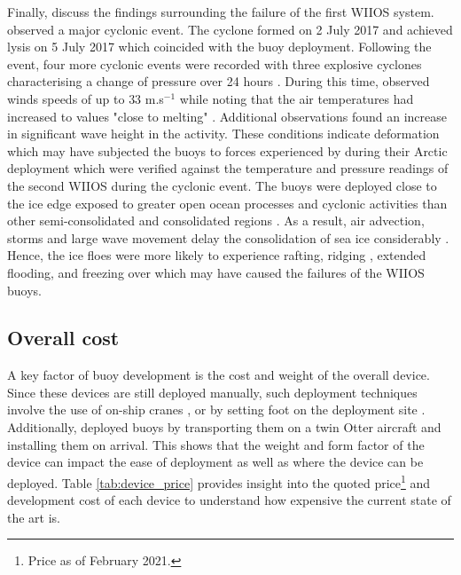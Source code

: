 Finally, \textcite{vichi2019effects} discuss the findings surrounding the failure of the first WIIOS system. \textcite{vichi2019effects} observed a major cyclonic event. The cyclone formed on  2 July 2017 and achieved lysis on 5 July 2017 which coincided with the buoy deployment. Following the event, four more cyclonic events were recorded with three explosive cyclones characterising a change of pressure over 24 hours \cite{vichi2019effects}. During this time, \textcite{vichi2019effects} observed winds speeds of up to $33$ m.s$^{-1}$ while noting that the air temperatures had increased to values "close to melting" \cite{vichi2019effects}. Additional observations found an increase in significant wave height in the activity. These conditions indicate deformation \cite{vichi2019effects} which may have subjected the buoys to forces experienced by \textcite{doble2017robust} during their Arctic deployment which were verified against the temperature and pressure readings of the second WIIOS during the cyclonic event. The buoys were deployed close to the ice edge exposed to greater open ocean processes and cyclonic activities than other semi-consolidated and consolidated regions \cite{vichi2019effects}. As a result, air advection, storms and large wave movement delay the consolidation of sea ice considerably \cite{vichi2019effects}. Hence, the ice floes were more likely to experience rafting, ridging \cite{icedefinition1992}, extended flooding, and freezing over which may have caused the failures of the WIIOS buoys.

\subsection{Overall cost}
\label{subsec:sec2_overallcost}
A key factor of buoy development is the cost and weight of the overall device. Since these devices are still deployed manually, such deployment techniques involve the use of on-ship cranes \cite{alberello2019drift,kohout2015device}, or by setting foot on the deployment site \cite{PLANCK2019102792,rabault2019open}. Additionally, \textcite{doble2017robust} deployed buoys by transporting them on a twin Otter aircraft and installing them on arrival. This shows that the weight and form factor of the device can impact the ease of deployment as well as where the device can be deployed. Table \ref{tab:device_price} provides insight into the quoted price\footnote[1]{Price as of February 2021.} and development cost of each device to understand how expensive the current state of the art is.

